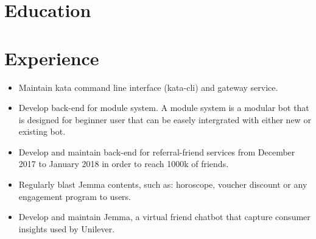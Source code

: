 \documentclass[11pt,a4paper,sans]{moderncv} %
\begin{document}
    
    \makecvtitle 
    
    
    \section{Education}
    
    
    
    
    \section{Experience}
    
    {
        \begin{itemize}
            \item Maintain kata command line interface (kata-cli) and gateway service.
            \item Develop back-end for module system. A module system is a modular bot that is designed for beginner user that can be easely intergrated with either new or existing bot.
            \item Develop and maintain back-end for referral-friend services from December 2017 to January 2018 in order to reach 1000k of friends.
            \item Regularly blast Jemma contents, such as: horoscope, voucher discount or any engagement program to users.
            \item Develop and maintain Jemma, a virtual friend chatbot that capture consumer insights used by Unilever.
        \end{itemize}
    }
    
\end{document}
